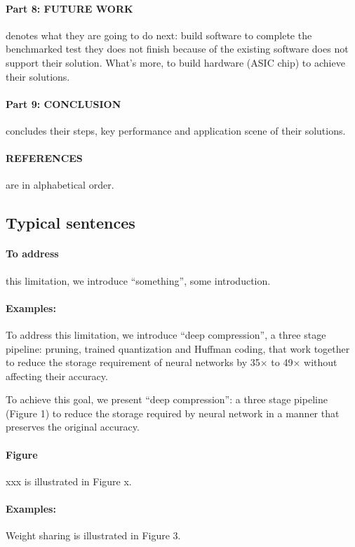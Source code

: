 \documentclass{article}
\begin{document}
\paragraph{Part 8: FUTURE WORK} denotes what they are going to do next: build software 
to complete the benchmarked test they does not finish because of the existing software 
does not support their solution. What's more, to build hardware (ASIC chip) to achieve 
their solutions.

\paragraph{Part 9: CONCLUSION} concludes their steps, key performance and application 
scene of their solutions.

\paragraph{REFERENCES} are in alphabetical order.

\subsection{Typical sentences}

\paragraph{To address} this limitation, we introduce “something”, some introduction.

\paragraph{Examples:} To
address this limitation, we introduce “deep compression”, a three stage pipeline:
pruning, trained quantization and Huffman coding, that work together to reduce
the storage requirement of neural networks by 35× to 49× without affecting their
accuracy.

To achieve this goal, we present “deep compression”: a three stage pipeline (Figure 1) 
to reduce the storage required by neural network in a manner that preserves the 
original accuracy.

\paragraph{Figure} xxx is illustrated in Figure x.
\paragraph{Examples:} Weight sharing is illustrated in Figure 3.
\end{document}
